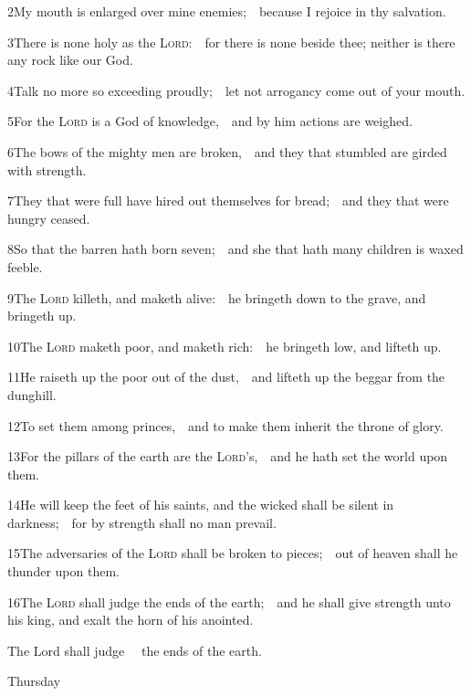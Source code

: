 2\enspace My mouth is enlarged over mine enemies;\ \star\ because I rejoice in thy salvation.

3\enspace There is none holy as the {\scshape Lord}:\ \star\ for there is none beside thee; neither is there any rock like our God.

4\enspace Talk no more so exceeding proudly;\ \star\ let not arrogancy come out of your mouth.

5\enspace For the {\scshape Lord} is a God of knowledge,\ \star\ and by him actions are weighed.

6\enspace The bows of the mighty men are broken,\ \star\ and they that stumbled are girded with strength.

7\enspace They that were full have hired out themselves for bread;\ \star\ and they that were hungry ceased.

8\enspace So that the barren hath born seven;\ \star\ and she that hath many children is waxed feeble.

9\enspace The {\scshape Lord} killeth, and maketh alive:\ \star\ he bringeth down to the grave, and bringeth up.

10\enspace The {\scshape Lord} maketh poor, and maketh rich:\ \star\ he bringeth low, and lifteth up.

11\enspace He raiseth up the poor out of the dust,\ \star\ and lifteth up the beggar from the dunghill.

12\enspace To set them among princes,\ \star\ and to make them inherit the throne of glory.

13\enspace For the pillars of the earth are the {\scshape Lord}’s,\ \star\ and he hath set the world upon them.

14\enspace He will keep the feet of his saints, and the wicked shall be silent in darkness;\ \star\ for by strength shall no man prevail.

15\enspace The adversaries of the {\scshape Lord} shall be broken to pieces;\ \star\ out of heaven shall he thunder upon them.

16\enspace The {\scshape Lord} shall judge the ends of the earth;\ \star\ and he shall give strength unto his king, and exalt the horn of his anointed.

 The Lord shall judge \ \star\ the ends of the earth.

\medskip
\centerline{Thursday}
\subsection{}

